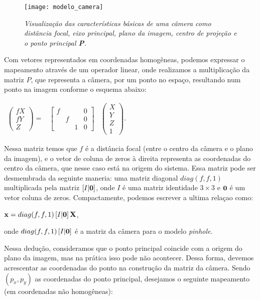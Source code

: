 \begin{figure}[!htb]
\centering
\texttt{[image: modelo\_camera]}
\caption{\textit{Visualização das características básicas de uma câmera como distância focal, eixo principal, plano da imagem, centro de projeção e o ponto principal {\bf P}.}}
\label{camera}
\end{figure}

Com vetores representados em coordenadas homogêneas, podemos expressar o mapeamento através de um operador linear, onde realizamos a multiplicação da matriz $P$, que representa a câmera, por um ponto no espaço, resultando num ponto na imagem conforme o esquema abaixo:

\begin{center}
$
\begin{array}{ccc}
\begin{pmatrix}
fX\\
fY\\
Z
\end{pmatrix} = 
&
\begin{bmatrix}
f& & &0\\
 &f& &0\\
 & &1&0
\end{bmatrix}
&
\begin{pmatrix}
X\\
Y\\
Z\\
1
\end{pmatrix}.
\end{array}
$
\end{center}
Nessa matriz temos que $f$ é a distância focal (entre o centro da câmera e o plano da imagem), e o vetor de coluna de zeros à direita representa as coordenadas do centro da câmera, que nesse caso está na origem do sistema. Essa matriz pode ser desmembrada da seguinte maneria: uma matriz diagonal $diag(f,f,1)$ multiplicada pela matriz $[I|{\bf 0}]$, onde $I$ é uma matriz identidade $3\times3$ e ${\bf 0}$ é um vetor coluna de zeros. Compactamente, podemos escrever a ultima relaçao como:

\begin{center}
$\mathbf{x} = diag(f,f,1)\,[I|{\bf 0}]\,\mathbf{X}$,
\end{center}
onde $diag(f,f,1)\,[I|{\bf 0}]$ é a matriz da câmera para o modelo \textit{pinhole}.

Nessa dedução, consideramos que o ponto principal  coincide com a origem do plano da imagem, mas na prática isso pode não acontecer. Dessa forma, devemos acrescentar as coordenadas do ponto na construção da matriz da câmera. Sendo $(p_x,p_y)$ as coordenadas do ponto principal, desejamos o seguinte mapeamento (em coordenadas não homogêneas):


